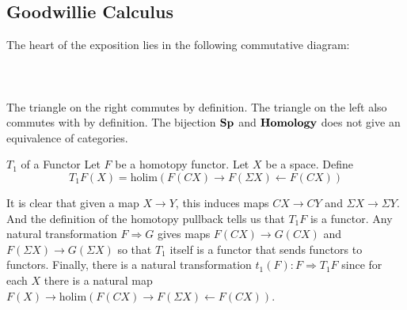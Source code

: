 \documentclass[a4paper]{article}
\begin{document}
\subsection{Goodwillie Calculus}
The heart of the exposition lies in the following commutative diagram: \\~\\
\\~\\
	


The triangle on the right commutes by definition. The triangle on the left also commutes with by definition. The bijection $\bold{Sp}$ and $\bold{Homology}$ does not give an equivalence of categories. 


\begin{defn}{$T_1$ of a Functor}{} Let $F$ be a homotopy functor. Let $X$ be a space.  Define $$T_1F(X)=\text{holim}(F(CX)\rightarrow F(\Sigma X)\leftarrow F(CX))$$
\end{defn}

It is clear that given a map $X\to Y$, this induces maps $CX\to CY$ and $\Sigma X\to\Sigma Y$. And the definition of the homotopy pullback tells us that $T_1F$ is a functor. Any natural transformation $F\Rightarrow G$ gives maps $F(CX)\to G(CX)$ and $F(\Sigma X)\to G(\Sigma X)$ so that $T_1$ itself is a functor that sends functors to functors. Finally, there is a natural transformation $t_1(F):F\Rightarrow T_1F$ since for each $X$ there is a natural map $F(X)\to\text{holim}(F(CX)\rightarrow F(\Sigma X)\leftarrow F(CX))$. 
\end{document}

